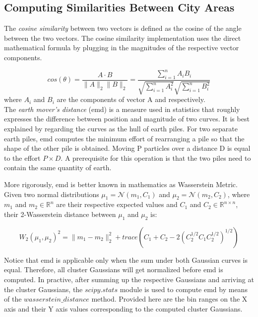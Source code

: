	\subsection{Computing Similarities Between City Areas}
	The \textit{cosine similarity} between two vectors is defined as the cosine of the angle between the two vectors. The cosine similarity implementation uses the direct mathematical formula by plugging in the magnitudes of the respective vector components.
	
	\begin{equation}
	cos(\theta)=\frac{A\cdot B}{{\lVert}A{\rVert}       
		_2{\lVert}B{\rVert}_2}=\frac{\sum_{i=1}^n{A_iB_i}}{\sqrt{\sum_{i=1}^n{A_i^2}}\sqrt{\sum_{i=1}^n{B_i^2}}}
	\end{equation}
	where $A_i$ and $B_i$ are the components of vector A and respectively. \\
	
	The \textit{earth mover's distance} (emd) is a measure used in statistics that roughly expresses the difference between position and magnitude of two curves. It is best explained by regarding the curves as the hull of earth piles. For two separate earth piles, emd computes the minimum effort of rearranging a pile so that the shape of the other pile is obtained. Moving P particles over a distance D is equal to the effort $P \times D$. A prerequisite for this operation is that the two piles need to contain the same quantity of earth.
	
	More rigorously, emd is better known in mathematics as Wasserstein Metric. Given two normal distributions $\mu_1=\mathcal{N}(m_1,C_1)$ and $\mu_2=\mathcal{N}(m_2,C_2)$, where $m_1$ and $m_2 \in \mathbb{R}^{n}$ are their respective expected values and $C_1$ and $C_2 \in \mathbb{R}^{n\times n}$, their 2-Wasserstein distance between $\mu_1$ and $\mu_2$ is:
	
	\begin{equation}
	W_2(\mu_1,\mu_2)^2={\lVert}m_1-m_2{\rVert}^2_2+trace(C_1+C_2-2(C_2^{1/2}C_1C_2^{1/2})^{1/2})
	\end{equation}
	
	Notice that emd is applicable only when the sum under both Gaussian curves is equal. Therefore, all cluster Gaussians will get normalized before emd is computed. In practive, after summing up the respective Gaussians and arriving at the cluster Gaussians, the $scipy.stats$ module is used to compute emd by means of the $wasserstein\_distance$ method. Provided here are the bin ranges on the X axis and their Y axis values corresponding to the computed cluster Gaussians.
	
